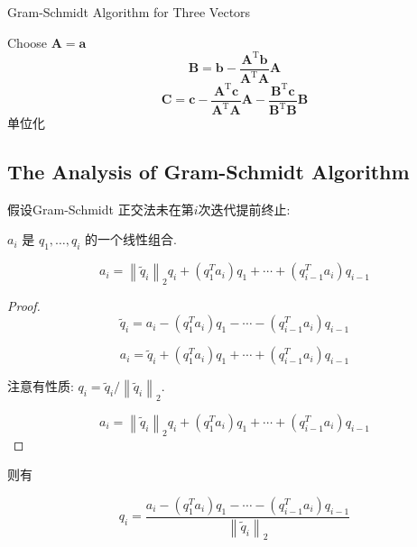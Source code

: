\begin{algorithm}
    \caption{Gram-Schmidt Algorithm for Three Vectors}
    Choose $ \boldsymbol{A}=\boldsymbol{a} $\;
    $$ \boldsymbol{B}=\boldsymbol{b}-\frac{\boldsymbol{A}^{\mathrm{T}} \boldsymbol{b}}{\boldsymbol{A}^{\mathrm{T}} \boldsymbol{A}} \boldsymbol{A} $$\;
    $$ \boldsymbol{C}=\boldsymbol{c}-\frac{\boldsymbol{A}^{\mathrm{T}} \boldsymbol{c}}{\boldsymbol{A}^{\mathrm{T}} \boldsymbol{A}} \boldsymbol{A}-\frac{\boldsymbol{B}^{\mathrm{T}} \boldsymbol{c}}{\boldsymbol{B}^{\mathrm{T}} \boldsymbol{B}} \boldsymbol{B}   $$\;
    单位化\;
\end{algorithm}

\subsection{The Analysis of Gram-Schmidt Algorithm}

假设Gram-Schmidt 正交法未在第$i$次迭代提前终止:

\begin{corollary}
    $ a_{i} $ 是 $ q_{1}, \ldots, q_{i} $ 的一个线性组合.
    
    $$ a_{i}=\left\|\tilde{q}_{i}\right\|_{2} q_{i}+\left(q_{1}^{T} a_{i}\right) q_{1}+\cdots+\left(q_{i-1}^{T} a_{i}\right) q_{i-1} $$
\end{corollary}

\begin{proof}
    $$ \widetilde{q}_{i}=a_{i}-\left(q_{1}^{T} a_{i}\right) q_{1}-\cdots-\left(q_{i-1}^{T} a_{i}\right) q_{i-1} $$

    $$a_{i}= \widetilde{q}_{i}+\left(q_{1}^{T} a_{i}\right) q_{1}+\cdots+\left(q_{i-1}^{T} a_{i}\right) q_{i-1} $$

    注意有性质: $ q_{i}=\widetilde{q}_{i} /\left\|\widetilde{q}_{i}\right\|_{2} $.

    $$ a_{i}=\left\|\tilde{q}_{i}\right\|_{2} q_{i}+\left(q_{1}^{T} a_{i}\right) q_{1}+\cdots+\left(q_{i-1}^{T} a_{i}\right) q_{i-1} $$
\end{proof}


则有 

\begin{corollary}
    $$q_{i} = \frac{a_{i}-\left(q_{1}^{T} a_{i}\right) q_{1}-\cdots-\left(q_{i-1}^{T} a_{i}\right) q_{i-1}}{\left\|\tilde{q}_{i}\right\|_{2}}$$
\end{corollary}


